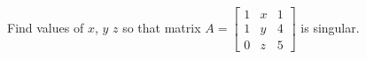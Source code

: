 Find values of $x$, $y$ $z$ so that matrix 
$A = 
\begin{bmatrix} 
1 & x & 1\\ 
1 & y & 4 \\ 
0 & z & 5 
\end{bmatrix}$ is singular.